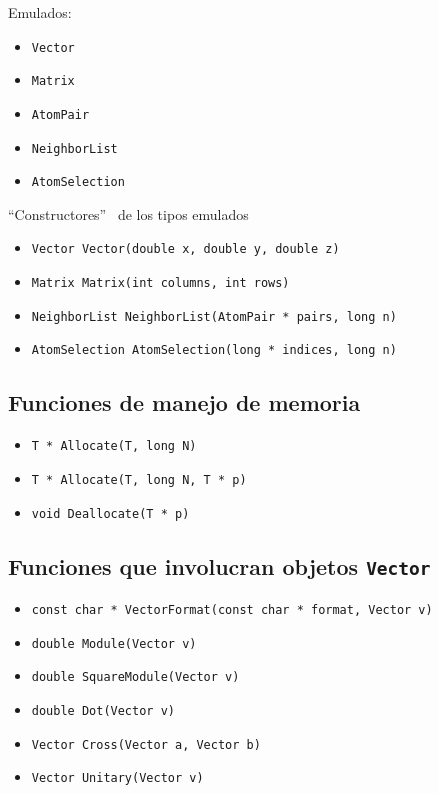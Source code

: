 \documentclass[a4paper,12pt]{article}
\begin{document}
Emulados:

\begin{itemize}
\item \verb'Vector'
\item \verb'Matrix'
\item \verb'AtomPair'
\item \verb'NeighborList'
\item \verb'AtomSelection'
\end{itemize}

``Constructores''\footnotemark ~ de los tipos emulados

\begin{itemize}
\item \verb'Vector Vector(double x, double y, double z)'
\item \verb'Matrix Matrix(int columns, int rows)'
\item \verb'NeighborList NeighborList(AtomPair * pairs, long n)'
\item \verb'AtomSelection AtomSelection(long * indices, long n)'

\end{itemize}


\subsection{Funciones de manejo de memoria}

\begin{itemize}
\item \verb'T * Allocate(T, long N)'
\item \verb'T * Allocate(T, long N, T * p)'
\item \verb'void Deallocate(T * p)'
\end{itemize}

\subsection{Funciones que involucran objetos \texttt{Vector}}

\begin{itemize}
\item \verb'const char * VectorFormat(const char * format, Vector v)'
\item \verb'double Module(Vector v)'
\item \verb'double SquareModule(Vector v)'
\item \verb'double Dot(Vector v)'
\item \verb'Vector Cross(Vector a, Vector b)'
\item \verb'Vector Unitary(Vector v)'
\end{itemize}
\end{document}
